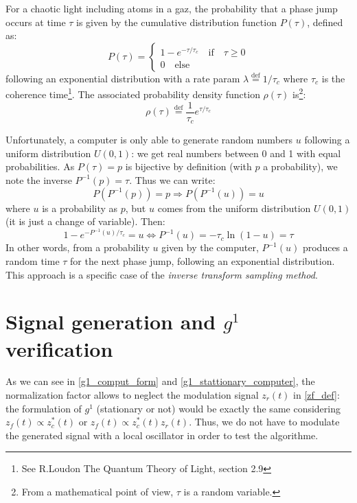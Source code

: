 \documentclass[10pt]{report}
\begin{document}
For a chaotic light including atoms in a gaz, the probability that a phase jump occurs at time $\tau$ is given by the cumulative distribution function $P(\tau)$, defined as:
\begin{equation}
P(\tau) = \left\{
                \begin{array}{ll}
                1-e^{-\tau/\tau_c} \quad \textrm{if} \quad \tau \geqslant 0\\
                0 \quad \textrm{else}
                \end{array}
              \right.
\end{equation}
following an exponential distribution with a rate param $\lambda \stackrel{\text{def}}{=} 1 / \tau_c$ where $\tau_c$ is the coherence time\footnote{ See R.Loudon The Quantum Theory of Light, section 2.9}. The associated probability density function $\rho(\tau)$ is\footnote{From a mathematical point of view, $\tau$ is a random variable.}:
\begin{equation}
\rho(\tau) \stackrel{\text{def}}{=} \frac{1}{\tau_c} e^{\tau / \tau_c}
\end{equation}

Unfortunately, a computer is only able to generate random numbers $u$ following a uniform distribution $U(0,1)$: we get real numbers between 0 and 1 with equal probabilities. As $P(\tau) = p$ is bijective by definition (with $p$ a probability), we note the inverse $P^{-1}(p) = \tau$. Thus we can write:
\begin{equation}
P(P^{-1}(p)) = p \Rightarrow P(P^{-1}(u)) = u
\end{equation}
where $u$ is a probability as $p$, but $u$ comes from the uniform distribution $U(0,1)$ (it is just a change of variable). Then:
\begin{equation}
\label{dist_exp_gene}
1-e^{-P^{-1}(u)/\tau_c} = u \Leftrightarrow P^{-1}(u) = -\tau_c \ln(1-u) = \tau
\end{equation}
In other words, from a probability $u$ given by the computer, $P^{-1}(u)$ produces a random time $\tau$ for the next phase jump, following an exponential distribution. This approach is a specific case of the \textit{inverse transform sampling method}.

\section{Signal generation and $g^1$ verification}

As we can see in \eqref{g1_comput_form} and \eqref{g1_stattionary_computer}, the normalization factor allows to neglect the modulation signal $z_r(t)$ in \eqref{zf_def}: the formulation of $g^1$ (stationary or not) would be exactly the same considering $z_f(t) \propto z_c^*(t)$ or $z_f(t) \propto z_c^*(t)z_r(t)$. Thus, we do not have to modulate the generated signal with a local oscillator in order to test the algorithme.
\end{document}
